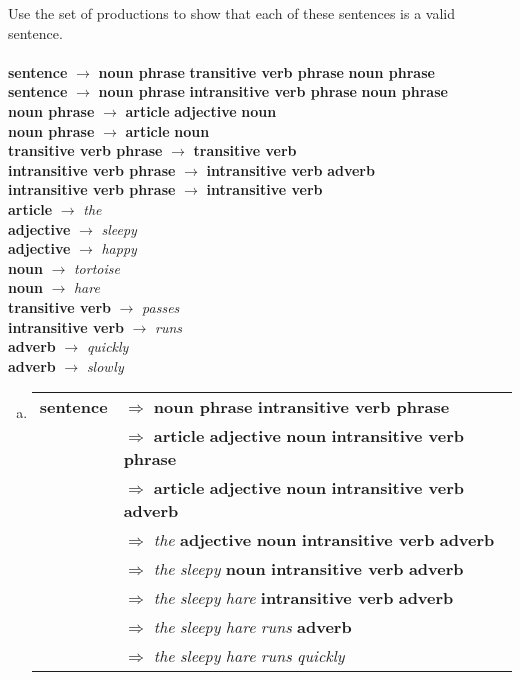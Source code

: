 \documentclass[../main.tex]{subfiles}
\begin{document}
Use the set of productions to show that each of these sentences is a valid sentence. \\
\\
{\bf sentence} $\rightarrow$ {\bf noun phrase} {\bf transitive verb phrase} {\bf noun phrase} \\
{\bf sentence} $\rightarrow$ {\bf noun phrase} {\bf intransitive verb phrase} {\bf noun phrase} \\
{\bf noun phrase} $\rightarrow$ {\bf article} {\bf adjective} {\bf noun} \\
{\bf noun phrase} $\rightarrow$ {\bf article} {\bf noun} \\
{\bf transitive verb phrase} $\rightarrow$ {\bf transitive verb} \\
{\bf intransitive verb phrase} $\rightarrow$ {\bf intransitive verb} {\bf adverb} \\
{\bf intransitive verb phrase} $\rightarrow$ {\bf intransitive verb} \\
{\bf article} $\rightarrow$ {\it the} \\
{\bf adjective} $\rightarrow$ {\it sleepy} \\
{\bf adjective} $\rightarrow$ {\it happy} \\
{\bf noun} $\rightarrow$ {\it tortoise} \\
{\bf noun} $\rightarrow$ {\it hare} \\
{\bf transitive verb} $\rightarrow$ {\it passes} \\
{\bf intransitive verb} $\rightarrow$ {\it runs} \\
{\bf adverb} $\rightarrow$ {\it quickly} \\
{\bf adverb} $\rightarrow$ {\it slowly}

\solution
\begin{enumerate}[a)]
	\item \hfill
		\begin{tabular}{ll}
			{\bf sentence} & $\Rightarrow$ {\bf noun phrase} {\bf intransitive verb phrase} \\
			               & $\Rightarrow$ {\bf article} {\bf adjective} {\bf noun} {\bf intransitive verb phrase} \\
						   & $\Rightarrow$ {\bf article} {\bf adjective} {\bf noun} {\bf intransitive verb} {\bf adverb} \\
						   & $\Rightarrow$ {\it the} {\bf adjective} {\bf noun} {\bf intransitive verb} {\bf adverb} \\
						   & $\Rightarrow$ {\it the} {\it sleepy} {\bf noun} {\bf intransitive verb} {\bf adverb} \\
						   & $\Rightarrow$ {\it the} {\it sleepy} {\it hare} {\bf intransitive verb} {\bf adverb} \\
						   & $\Rightarrow$ {\it the} {\it sleepy} {\it hare} {\it runs} {\bf adverb} \\
						   & $\Rightarrow$ {\it the} {\it sleepy} {\it hare} {\it runs} {\it quickly} \\
		\end{tabular}
\end{enumerate}
\end{document}

